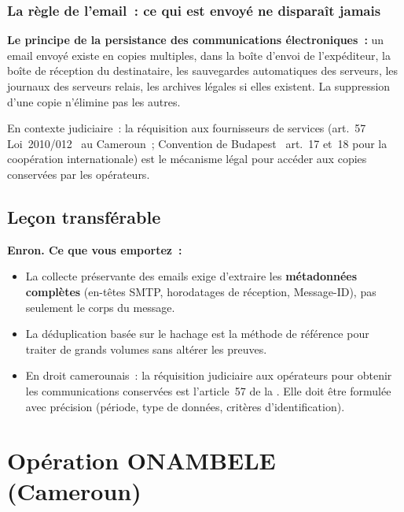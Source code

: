 \subsubsection{La règle de l'email~: ce qui est envoyé ne disparaît jamais}

\begin{boxalert}
\textbf{Le principe de la persistance des communications électroniques~:}
un email envoyé existe en copies multiples, dans la boîte d'envoi de
l'expéditeur, la boîte de réception du destinataire, les sauvegardes
automatiques des serveurs, les journaux des serveurs relais, les archives
légales si elles existent. La suppression d'une copie n'élimine pas les autres.

En contexte judiciaire~: la réquisition aux fournisseurs de services
(art.~57 Loi~2010/012~\cite{cameroun2010a} au Cameroun~; Convention de Budapest~\cite{budapest2001} art.~17 et~18
pour la coopération internationale) est le mécanisme légal pour accéder
aux copies conservées par les opérateurs.
\end{boxalert}

\subsection{Leçon transférable}

\begin{boxresume}
\textbf{Enron. Ce que vous emportez~:}
\begin{itemize}
    \item La collecte préservante des emails exige d'extraire les
          \textbf{métadonnées complètes} (en-têtes SMTP, horodatages
          de réception, Message-ID), pas seulement le corps du message.
    \item La déduplication basée sur le hachage est la méthode de référence
          pour traiter de grands volumes sans altérer les preuves.
    \item En droit camerounais~: la réquisition judiciaire aux opérateurs
          pour obtenir les communications conservées est l'article~57
          de la . Elle doit être formulée avec précision
          (période, type de données, critères d'identification).
\end{itemize}
\end{boxresume}

\section{Opération ONAMBELE (Cameroun)}
\label{sec:onambele}

